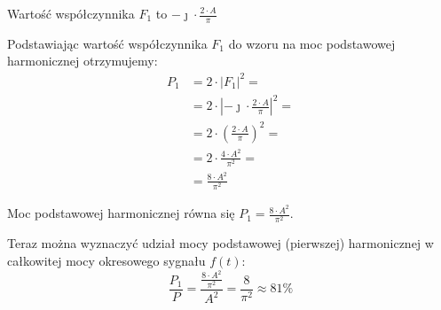 \begin{task}
Wartość współczynnika $F_1$ to $-\jmath \cdot \frac{2 \cdot A}{\pi}$

Podstawiając wartość współczynnika $F_1$ do wzoru na moc podstawowej harmonicznej otrzymujemy:
\begin{align*}
P_1&=2 \cdot \left|F_{1}\right|^2=\\
&=2 \cdot \left|-\jmath \cdot \frac{2 \cdot A}{\pi}\right|^2=\\
&=2 \cdot \left(\frac{2 \cdot A}{\pi}\right)^2=\\
&=2 \cdot \frac{4 \cdot A^2}{\pi^2}=\\
&=\frac{8 \cdot A^2}{\pi^2}
\end{align*}

Moc podstawowej harmonicznej równa się $P_1=\frac{8 \cdot A^2}{\pi^2}$.

Teraz można wyznaczyć udział mocy podstawowej (pierwszej) harmonicznej w całkowitej mocy okresowego sygnału $f(t)$:
\begin{equation}
\frac{P_1}{P} = \frac{\frac{8 \cdot A^2}{\pi^2}}{A^2} = \frac{8}{\pi^2} \approx 81\%
\end{equation}


\end{task}